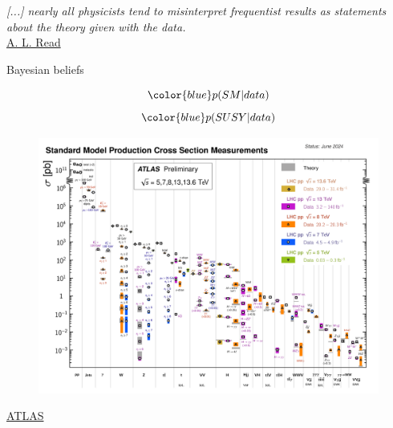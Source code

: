 \documentclass[
aspectratio=169,
14pt,
professionalfonts
]{beamer}
\begin{document}
\begin{frame}
    \textit{ [...] nearly all physicists tend to misinterpret frequentist results as statements about the theory given with the data.}\\
    \flushright \href{https://indico.cern.ch/event/398949/attachments/799330/1095613/The_CLs_Technique.pdf}{A. L. Read}
\end{frame}

\begin{frame}{Bayesian beliefs}
    \begin{minipage}{0.44\textwidth}
        $$\color{blue} p(SM|data)$$
        $$\color{blue} p(SUSY|data)$$
    \end{minipage}
    \begin{minipage}{0.55\textwidth}
        \begin{figure}
            \centering
            \includegraphics[width=\textwidth]{../plots/sm_pred.png}
        \end{figure}
        \small \flushright
        \href{https://atlas.web.cern.ch/Atlas/GROUPS/PHYSICS/PUBNOTES/ATL-PHYS-PUB-2024-011/fig_03a.png}{ATLAS}
    \end{minipage}
\end{frame}
\end{document}
